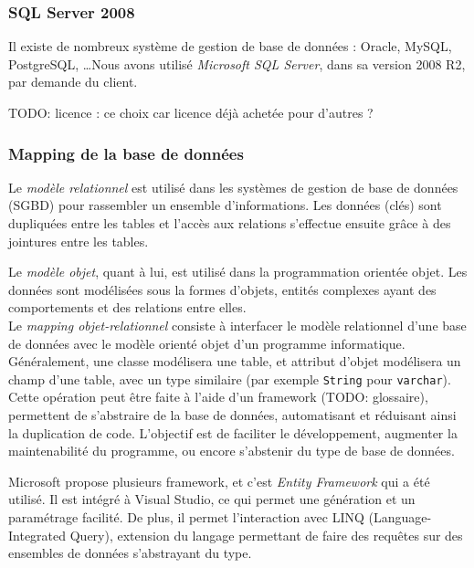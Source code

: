 
\subsubsection{SQL Server 2008}

Il existe de nombreux système de gestion de base de données : Oracle, MySQL, PostgreSQL, \ldots Nous avons utilisé \textit{Microsoft SQL Server}, dans sa version 2008 R2, par demande du client.

TODO: licence : ce choix car licence déjà achetée pour d'autres ?


\subsubsection{Mapping de la base de données}

Le \textit{modèle relationnel} est utilisé dans les systèmes de gestion de base de données (SGBD) pour rassembler un ensemble d'informations. Les données (clés) sont dupliquées entre les tables et l'accès aux relations s'effectue ensuite grâce à des jointures entre les tables.

Le \textit{modèle objet}, quant à lui, est utilisé dans la programmation orientée objet. Les données sont modélisées sous la formes d'objets, entités complexes ayant des comportements et des relations entre elles.
\\

Le \textit{mapping objet-relationnel} consiste à interfacer le modèle relationnel d'une base de données avec le modèle orienté objet d'un programme informatique. Généralement, une classe modélisera une table, et attribut d'objet modélisera un champ d'une table, avec un type similaire (par exemple \lstinline{String} pour \lstinline{varchar}).
\\

Cette opération peut être faite à l'aide d'un framework (TODO: glossaire), permettent de s'abstraire de la base de données, automatisant et réduisant ainsi la duplication de code. L'objectif est de faciliter le développement, augmenter la maintenabilité du programme, ou encore s'abstenir du type de base de données.

Microsoft propose plusieurs framework, et c'est \textit{Entity Framework} qui a été utilisé. Il est intégré à Visual Studio, ce qui permet une génération et un paramétrage facilité. De plus, il permet l'interaction avec  LINQ (Language-Integrated Query), extension du langage permettant de faire des requêtes sur des ensembles de données s'abstrayant du type.

